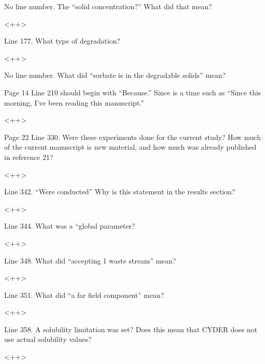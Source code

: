 \documentclass[answers,12pt]{exam}
\begin{document}
\begin{questions}
\question No line number. The “solid concentration?” What did that mean?
\begin{solution}
<++>
\end{solution}

 

\question Line 177. What type of degradation?
\begin{solution}
<++>
\end{solution}

 

\question No line number. What did “sorbate is in the degradable solids” mean?

 

\question Page 14 Line 210 should begin with “Because.” Since is a time such as “Since this morning, I’ve been reading this manuscript.”
\begin{solution}
<++>
\end{solution}

 

\question Page 22 Line 330. Were these experiments done for the current study? How much of the current manuscript is new material, and how much was already published in reference 21?
\begin{solution}
<++>
\end{solution}

 

\question Line 342. “Were conducted” Why is this statement in the results section?
\begin{solution}
<++>
\end{solution}

 

\question Line 344. What was a “global parameter?
\begin{solution}
<++>
\end{solution}

 

\question Line 348. What did “accepting 1 waste stream” mean?
\begin{solution}
<++>
\end{solution}

 

\question Line 351. What did “a far field component” mean?
\begin{solution}
<++>
\end{solution}

 

\question Line 358. A solubility limitation was set? Does this mean that CYDER does not use actual solubility values?
\begin{solution}
<++>
\end{solution}


\end{questions}
\end{document}
